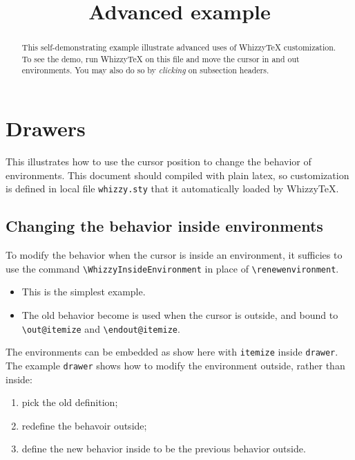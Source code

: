 \documentclass{article}
\title {Advanced example}
\newenvironment{drawer}[1]{\subsection{#1}}{}
\begin{document}
\maketitle
\begin{abstract}
This self-demonstrating example illustrate advanced uses of {WhizzyTeX}
customization. To see the demo, run WhizzyTeX on this file and move the
cursor in and out environments. You may also do so by \emph{clicking}
on subsection headers.
\end{abstract}


\section{Drawers}
This illustrates how to use the cursor position to change the behavior of
environments. This document should compiled with plain latex, so
customization is defined in local file \verb"whizzy.sty" that it
automatically loaded by WhizzyTeX.

\begin{drawer}{Changing the behavior inside environments}
To modify the behavior when the cursor is inside an environment, it
sufficies to use the command \verb"\WhizzyInsideEnvironment" 
in place of \verb"\renewenvironment". 
\begin{itemize}
\item This is the simplest example. 
\item The old behavior become is used when the cursor is outside, and bound
to \verb"\out@itemize" and \verb"\endout@itemize". 
\end{itemize}
The environments can be embedded as show here with \verb"itemize" inside
\verb"drawer". 
The example \verb"drawer" shows how to modify the environment outside,
rather than inside: 
\begin{enumerate}
\item pick the old definition;
\item redefine the behavoir outside;
\item define the new behavior inside to be the previous behavior outside.
\end{enumerate}
\end{drawer}
\end{document}
